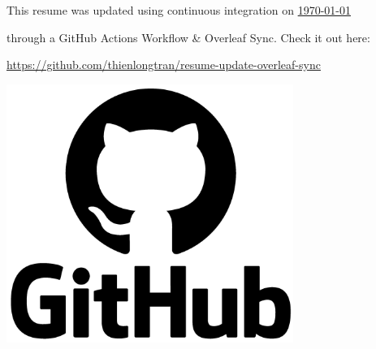 \documentclass[letterpaper,11pt]{article}
\begin{document}
\vspace*{\fill}

\begin{minipage}{0.6\textwidth}
This resume was updated using continuous integration on \underline{\today}

through a GitHub Actions Workflow \& Overleaf Sync. Check it out here:

\href{https://github.com/thienlongtran/resume-update-overleaf-sync}{https://github.com/thienlongtran/resume-update-overleaf-sync}
\end{minipage}
\hfill%
\begin{minipage}{0.3\textwidth}\raggedleft
\includegraphics[width=0.7\textwidth]{gha-logo.png}
\end{minipage}
\vspace*{\fill}

\end{document}

